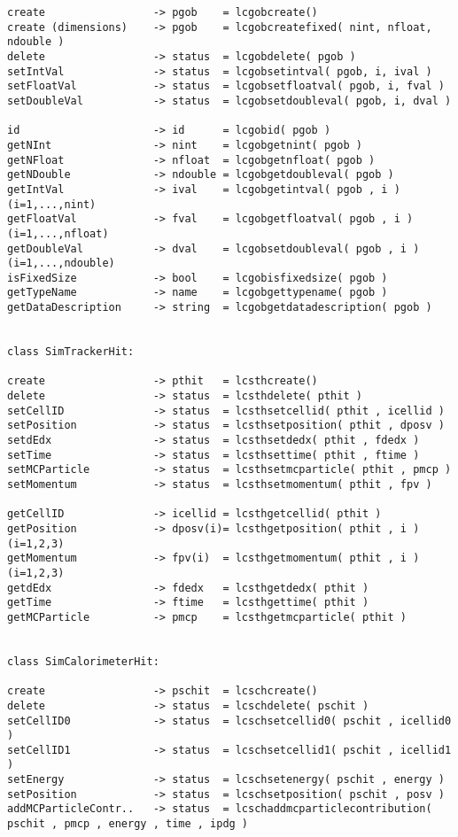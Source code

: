 \begin{scriptsize}
\begin{verbatim}
create                 -> pgob    = lcgobcreate()
create (dimensions)    -> pgob    = lcgobcreatefixed( nint, nfloat, ndouble )
delete                 -> status  = lcgobdelete( pgob )
setIntVal              -> status  = lcgobsetintval( pgob, i, ival )
setFloatVal            -> status  = lcgobsetfloatval( pgob, i, fval )
setDoubleVal           -> status  = lcgobsetdoubleval( pgob, i, dval )

id                     -> id      = lcgobid( pgob )
getNInt                -> nint    = lcgobgetnint( pgob )
getNFloat              -> nfloat  = lcgobgetnfloat( pgob )
getNDouble             -> ndouble = lcgobgetdoubleval( pgob )
getIntVal              -> ival    = lcgobgetintval( pgob , i )      (i=1,...,nint)
getFloatVal            -> fval    = lcgobgetfloatval( pgob , i )    (i=1,...,nfloat)
getDoubleVal           -> dval    = lcgobsetdoubleval( pgob , i )   (i=1,...,ndouble)
isFixedSize            -> bool    = lcgobisfixedsize( pgob )
getTypeName            -> name    = lcgobgettypename( pgob )
getDataDescription     -> string  = lcgobgetdatadescription( pgob )


class SimTrackerHit:

create                 -> pthit   = lcsthcreate()
delete                 -> status  = lcsthdelete( pthit )
setCellID              -> status  = lcsthsetcellid( pthit , icellid )
setPosition            -> status  = lcsthsetposition( pthit , dposv )
setdEdx                -> status  = lcsthsetdedx( pthit , fdedx )
setTime                -> status  = lcsthsettime( pthit , ftime )
setMCParticle          -> status  = lcsthsetmcparticle( pthit , pmcp )
setMomentum            -> status  = lcsthsetmomentum( pthit , fpv )

getCellID              -> icellid = lcsthgetcellid( pthit )
getPosition            -> dposv(i)= lcsthgetposition( pthit , i ) (i=1,2,3)
getMomentum            -> fpv(i)  = lcsthgetmomentum( pthit , i ) (i=1,2,3)
getdEdx                -> fdedx   = lcsthgetdedx( pthit )
getTime                -> ftime   = lcsthgettime( pthit )
getMCParticle          -> pmcp    = lcsthgetmcparticle( pthit )


class SimCalorimeterHit:

create                 -> pschit  = lcschcreate()
delete                 -> status  = lcschdelete( pschit )
setCellID0             -> status  = lcschsetcellid0( pschit , icellid0 )
setCellID1             -> status  = lcschsetcellid1( pschit , icellid1 )
setEnergy              -> status  = lcschsetenergy( pschit , energy )
setPosition            -> status  = lcschsetposition( pschit , posv )
addMCParticleContr..   -> status  = lcschaddmcparticlecontribution( pschit , pmcp , energy , time , ipdg )


\end{verbatim}
\end{scriptsize}
